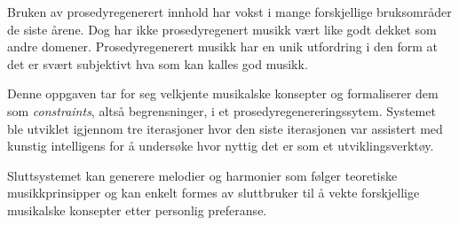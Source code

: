 Bruken av prosedyregenerert innhold har vokst i mange forskjellige bruksområder de siste årene. Dog har ikke prosedyregenert musikk vært like godt dekket som andre domener. Prosedyregenerert musikk har en unik utfordring i den form at det er svært subjektivt hva som kan kalles god musikk.

Denne oppgaven tar for seg velkjente musikalske konsepter og formaliserer dem som \textit{constraints}, altså begrensninger, i et prosedyregenereringssytem. Systemet ble utviklet igjennom tre iterasjoner hvor den siste iterasjonen var assistert med kunstig intelligens for å undersøke hvor nyttig det er som et utviklingsverktøy.

Sluttsystemet kan generere melodier og harmonier som følger teoretiske musikkprinsipper og kan enkelt formes av sluttbruker til å vekte forskjellige musikalske konsepter etter personlig preferanse.
